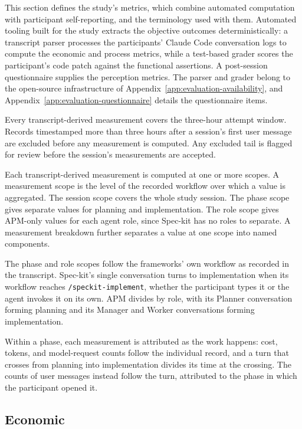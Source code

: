 This section defines the study's metrics, which combine automated computation with participant self-reporting, and the terminology used with them. Automated tooling built for the study extracts the objective outcomes deterministically: a transcript parser processes the participants' Claude Code conversation logs to compute the economic and process metrics, while a test-based grader scores the participant's code patch against the functional assertions. A post-session questionnaire supplies the perception metrics. The parser and grader belong to the open-source infrastructure of Appendix~\ref{app:evaluation-availability}, and Appendix~\ref{app:evaluation-questionnaire} details the questionnaire items.

Every transcript-derived measurement covers the three-hour attempt window. Records timestamped more than three hours after a session's first user message are excluded before any measurement is computed. Any excluded tail is flagged for review before the session's measurements are accepted.

Each transcript-derived measurement is computed at one or more scopes. A measurement scope is the level of the recorded workflow over which a value is aggregated. The session scope covers the whole study session. The phase scope gives separate values for planning and implementation. The role scope gives APM-only values for each agent role, since Spec-kit has no roles to separate. A measurement breakdown further separates a value at one scope into named components.

The phase and role scopes follow the frameworks' own workflow as recorded in the transcript. Spec-kit's single conversation turns to implementation when its workflow reaches \texttt{/speckit-implement}, whether the participant types it or the agent invokes it on its own. APM divides by role, with its Planner conversation forming planning and its Manager and Worker conversations forming implementation.

Within a phase, each measurement is attributed as the work happens: cost, tokens, and model-request counts follow the individual record, and a turn that crosses from planning into implementation divides its time at the crossing. The counts of user messages instead follow the turn, attributed to the phase in which the participant opened it.

\subsection{Economic}
\label{sec:evaluation-metrics-economic}

